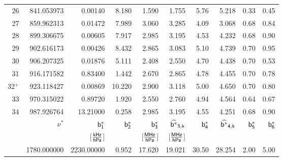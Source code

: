 {\begin{landscape}
\begin{longtable}{rrrrrrrrrr}
26     & 841.053973 & 0.00140 & 8.180 & 1.590 & 1.755 & 5.76 & 5.218 & 0.33 & 0.45 \\
27     & 859.962313 & 0.01472 & 7.989 & 3.060 & 3.285 & 4.09 & 3.068 & 0.68 & 0.84 \\
28     & 899.306675 & 0.00605 & 7.917 & 2.985 & 3.195 & 4.53 & 4.232 & 0.68 & 0.90 \\
29     & 902.616173 & 0.00426 & 8.432 & 2.865 & 3.083 & 5.10 & 4.739 & 0.70 & 0.95 \\
30     & 906.207325 & 0.01876 & 5.111 & 2.408 & 2.550 & 4.70 & 4.438 & 0.70 & 0.53 \\
31     & 916.171582 & 0.83400 & 1.442 & 2.670 & 2.865 & 4.78 & 4.455 & 0.70 & 0.78 \\
32$^+$ & 923.118427 & 0.00869 & 10.220& 2.900 & 3.118 & 5.00 & 4.650 & 0.70 & 0.80 \\
33     & 970.315022 & 0.89720 & 1.920 & 2.550 & 2.760 & 4.94 & 4.564 & 0.64 & 0.67 \\
34     & 987.926764 & 13.21000& 0.258 & 2.985 & 3.195 & 4.55 & 4.251 & 0.68 & 0.90 \\
\hline
 & $\nu^*$ & $\sf b^*_{\sf 1}$ & $\sf b^*_{\sf 2}$ & $\sf b^*_{\sf 3}$ & $\sf \widehat{b^*}_{\sf 3,k}$ & $\sf b^*_{\sf 4}$ &
 $\sf \widehat{b^*}_{\sf 4,k}$ & $\sf b^*_{\sf 5}$ & $\sf b^*_{\sf 6}$\\
 & {\sf [GHz]}  & {[$\frac{\sf kHz}{\sf hPa}$]} & {\sf [1]} & 
 {[$\frac{\sf MHz}{\sf hPa}$]} & {[$\frac{\sf MHz}{\sf hPa}$]} & 
 {\sf [1]} & {\sf [1]} & {\sf [1]} & {\sf [1]} \\
\hline
 & 1780.000000 & 2230.00000 & 0.952 & 17.620 & 19.021 & 30.50 & 28.254 & 2.00 & 5.00 \\
\end{longtable}
\end{landscape}



}
